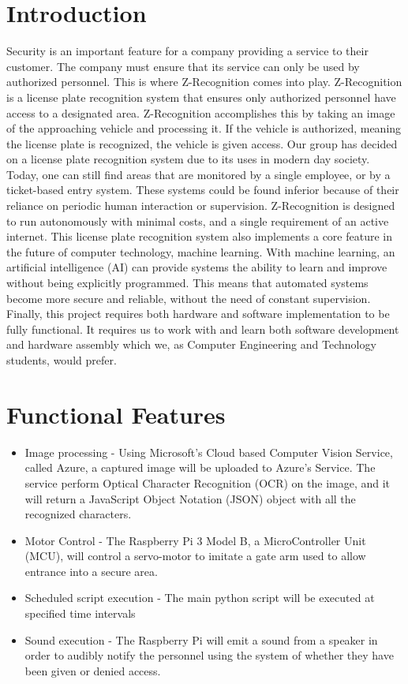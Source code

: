 \documentclass[12pt]{article}
\begin{document}
\section{Introduction}
Security is an important feature for a company providing a service to their customer. The company must ensure that its service can only be used by authorized personnel. This is where Z-Recognition comes into play. Z-Recognition is a license plate recognition system that ensures only authorized personnel have access to a designated area. Z-Recognition accomplishes this by taking an image of the approaching vehicle and processing it. If the vehicle is authorized, meaning the license plate is recognized, the vehicle is given access. Our group has decided on a license plate recognition system due to its uses in modern day society. Today, one can still find areas that are monitored by a single employee, or by a ticket-based entry system. These systems could be found inferior because of their reliance on periodic human interaction or supervision. Z-Recognition is designed to run autonomously with minimal costs, and a single requirement of an active internet. This license plate recognition system also implements a core feature in the future of computer technology, machine learning. With machine learning, an artificial intelligence (AI) can provide systems the ability to learn and improve without being explicitly programmed. This means that automated systems become more secure and reliable, without the need of constant supervision. Finally, this project requires both hardware and software implementation to be fully functional. It requires us to work with and learn both software development and hardware assembly which we, as Computer Engineering and Technology students, would prefer.
\vspace{2cm}

\section{Functional Features}
\begin{itemize}
    \item Image processing - Using Microsoft's Cloud based Computer Vision Service, called Azure, a captured image will be uploaded to Azure's Service. The service perform Optical Character Recognition (OCR) on the image, and it will return a JavaScript Object Notation (JSON) object with all the recognized characters.
    \item Motor Control - The Raspberry Pi 3 Model B, a MicroController Unit (MCU), will control a servo-motor to imitate a gate arm used to allow entrance into a secure area.
    \item Scheduled script execution - The main python script will be executed at specified time intervals
    \item Sound execution - The Raspberry Pi will emit a sound from a speaker in order to audibly notify the personnel using the system of whether they have been given or denied access.
\end{itemize}
\end{document}
